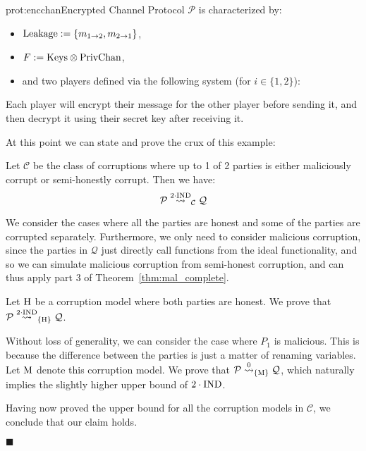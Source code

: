 \begin{protocol}{prot:encchan}{Encrypted Channel Protocol}
    $\mathcal{P}$ is characterized by:
    \begin{itemize}
        \item $\text{Leakage} := \{m_{1\to 2}, m_{2\to1}\}$,
        \item $F := \text{Keys} \otimes \text{PrivChan}$,
        \item and two players defined via the following system (for $i \in \{1, 2\}$):
    \end{itemize}

\end{protocol}

Each player will encrypt their message for the other player before sending it,
and then decrypt it using their secret key after receiving it.

At this point we can state and prove the crux of this example:

\begin{claim}
Let $\mathcal{C}$ be the class of corruptions where up to 1 of 2 parties
is either maliciously corrupt or semi-honestly corrupt.
Then we have:
$$
\mathcal{P} \overset{2 \cdot \text{IND}}{\leadsto}_{\mathcal{C}} \mathcal{Q}
$$

 We consider the cases where all the parties are honest
and some of the parties are corrupted separately.
Furthermore, we only need to consider malicious corruption,
since the parties in $\mathcal{Q}$ just directly call functions from
the ideal functionality, and so we can simulate malicious corruption
from semi-honest corruption, and can thus apply part 3
of Theorem~\ref{thm:mal_complete}.

 Let $\text{H}$ be a corruption model where both parties are honest.
We prove that $\mathcal{P} \overset{2 \cdot \text{IND}}{\leadsto}_{\{\text{H}\}} \mathcal{Q}$.

Without loss of generality, we can consider the case where $P_1$ is malicious.
This is because the difference between the parties is just a matter of renaming
variables.
Let $\text{M}$ denote this corruption model.
We prove that $\mathcal{P} \overset{0}{\leadsto}_{\{\text{M}\}} \mathcal{Q}$,
which naturally implies the slightly higher upper bound of $2 \cdot \text{IND}$.

Having now proved the upper bound for all the corruption models in $\mathcal{C}$,
we conclude that our claim holds.

$\blacksquare$
\end{claim}